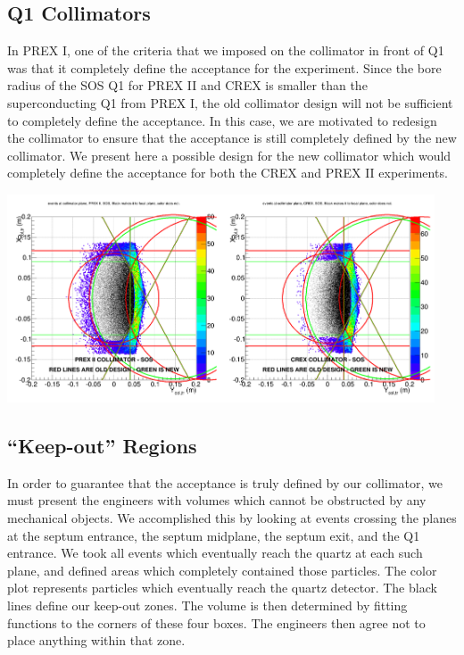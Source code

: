 \documentclass[11pt]{amsart}
\begin{document}
\subsection{ Q1 Collimators }

In PREX I, one of the criteria that we imposed on the collimator in front of Q1 was that it completely define the acceptance for the experiment. Since the bore radius of the SOS Q1 for PREX II and CREX is smaller than the superconducting Q1 from PREX I, the old collimator design will not be sufficient to completely define the acceptance. In this case, we are motivated to redesign the collimator to ensure that the acceptance is still completely defined by the new collimator. We present here a possible design for the new collimator which would completely define the acceptance for both the CREX and PREX II experiments.

\FloatBarrier
\includegraphics[width=0.95\textwidth]{plots/newcol.png}
\FloatBarrier

\subsection{ ``Keep-out'' Regions }

In order to guarantee that the acceptance is truly defined by our collimator, we must present the engineers with volumes which cannot be obstructed by any mechanical objects. We accomplished this by looking at events crossing the planes at the septum entrance, the septum midplane, the septum exit, and the Q1 entrance. We took all events which eventually reach the quartz at each such plane, and defined areas which completely contained those particles. The color plot represents particles which eventually reach the quartz detector. The black lines define our keep-out zones. The volume is then determined by fitting functions to the corners of these four boxes. The engineers then agree not to place anything within that zone.
\end{document}
